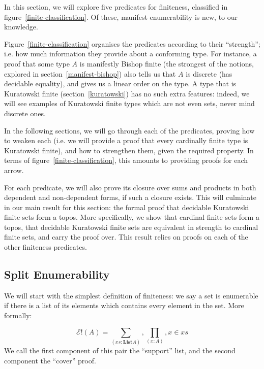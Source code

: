 In this section, we will explore five predicates for finiteness, classified in
figure~\ref{finite-classification}.
Of these, manifest enumerability is new, to our knowledge.

Figure~\ref{finite-classification} organises the predicates according to
their ``strength''; i.e. how much information they provide about a conforming
type.
For instance, a proof that some type \(A\) is manifestly Bishop finite (the
strongest of the notions, explored in section~\ref{manifest-bishop}) also tells
us that \(A\) is discrete (has decidable equality), and gives us a linear order
on the type.
A type that is Kuratowski finite (section~\ref{kuratowski}) has no such extra
features: indeed, we will see examples of Kuratowski finite types which are not
even sets, never mind discrete ones.

In the following sections, we will go through each of the predicates, proving
how to weaken each (i.e. we will provide a proof that every cardinally finite
type is Kuratowski finite), and how to strengthen them, given the required
property.
In terms of figure~\ref{finite-classification}, this amounts to providing proofs
for each arrow.

For each predicate, we will also prove its closure over sums and products in
both dependent and non-dependent forms, if such a closure exists.
This will culminate in our main result for this section: the formal proof that
decidable Kuratowski finite sets form a topos. 
More specifically, we show that cardinal finite sets form a topos, that
decidable Kuratowski finite sets are equivalent in strength to cardinal finite
sets, and carry the proof over.
This result relies on proofs on each of the other finiteness predicates.
\subsection{Split Enumerability} \label{split-enumerable}
We will start with the simplest definition of finiteness: we say a set is
enumerable if there is a list of its elements which contains every element in
the set.
More formally:
\begin{definition}
  \begin{equation}
    \mathcal{E}!(A) = \sum_{(\mathit{xs} : \textbf{List} A)} , \prod_{(x : A)} , x \in xs
  \end{equation}
  We call the first component of this pair the ``support'' list, and the second
  component the ``cover'' proof.
\end{definition}

